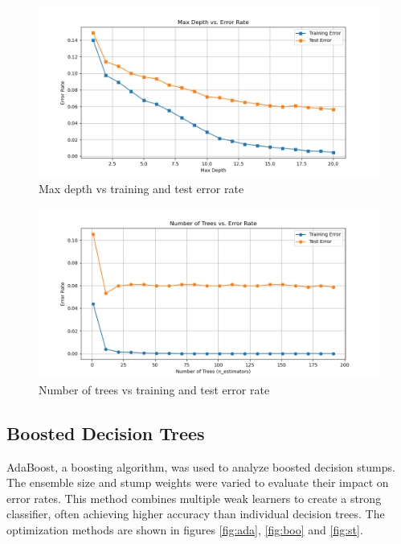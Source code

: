\documentclass[12pt]{article}
\begin{document}
\begin{figure}[h!]
    \centering
    \includegraphics[width=0.8\linewidth]{figures/Random Forests/Max depth vs error rate.png}
    \caption{Max depth vs training and test error rate}
    \label{fig:idk}
\end{figure}

\begin{figure}[h!]
    \centering
    \includegraphics[width=0.8\linewidth]{figures/Random Forests/Number of trees vs error rate.png}
    \caption{Number of trees vs training and test error rate}
    \label{fig:smth}
\end{figure}

\subsection{Boosted Decision Trees}
AdaBoost, a boosting algorithm, was used to analyze boosted decision stumps. The ensemble size and stump weights were varied to evaluate their impact on error rates. This method combines multiple weak learners to create a strong classifier, often achieving higher accuracy than individual decision trees. The optimization methods are shown in figures \ref{fig:ada}, \ref{fig:boo} and \ref{fig:st}.
\end{document}
